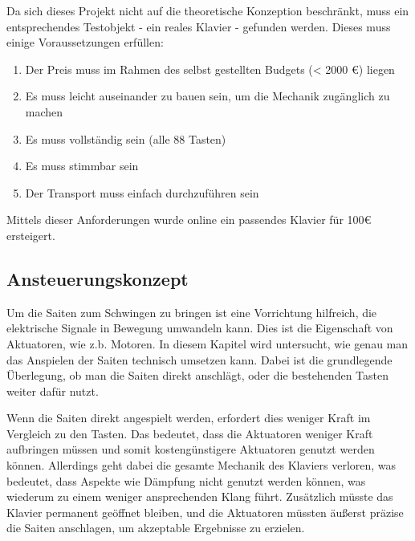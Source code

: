 Da sich dieses Projekt nicht auf die theoretische Konzeption beschränkt, muss ein entsprechendes Testobjekt - ein reales Klavier - gefunden werden.
Dieses muss einige Voraussetzungen erfüllen:
\begin{enumerate}
	\item 	Der Preis muss im Rahmen des selbst gestellten Budgets (< 2000 €) liegen %
	\item 	Es muss leicht auseinander zu bauen sein, um die Mechanik zugänglich zu machen
	\item 	Es muss vollständig sein (alle 88 Tasten)
	\item 	Es muss stimmbar sein
	\item 	Der Transport muss einfach durchzuführen sein
\end{enumerate}

Mittels dieser Anforderungen wurde online ein passendes Klavier für 100€ ersteigert.

\subsection{Ansteuerungskonzept} \label{subsec:konzeptionhw-ansteuerungskonzept}

Um die Saiten zum Schwingen zu bringen ist eine Vorrichtung hilfreich, die elektrische Signale in Bewegung umwandeln kann.
Dies ist die Eigenschaft von Aktuatoren, wie z.b. Motoren.
In diesem Kapitel wird untersucht, wie genau man das Anspielen der Saiten technisch umsetzen kann.
Dabei ist die grundlegende Überlegung, ob man die Saiten direkt anschlägt,
oder die bestehenden Tasten weiter dafür nutzt.

Wenn die Saiten direkt angespielt werden, erfordert dies weniger Kraft im Vergleich zu den Tasten.
Das bedeutet, dass die Aktuatoren weniger Kraft aufbringen müssen und somit kostengünstigere
Aktuatoren genutzt werden können.
Allerdings geht dabei die gesamte Mechanik des Klaviers verloren, was bedeutet, dass Aspekte wie Dämpfung nicht genutzt werden können,
was wiederum zu einem weniger ansprechenden Klang führt. Zusätzlich müsste das Klavier permanent geöffnet bleiben, und die
Aktuatoren müssten äußerst präzise die Saiten anschlagen, um akzeptable Ergebnisse zu erzielen.


